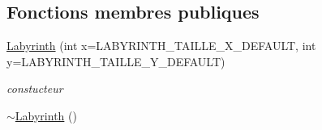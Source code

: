 \subsection*{Fonctions membres publiques}
\begin{DoxyCompactItemize}
\item 
\hyperlink{class_labyrinth_a13480c96c7e8d937adf6fd0b2dce8b6d}{Labyrinth} (int x=L\-A\-B\-Y\-R\-I\-N\-T\-H\-\_\-\-T\-A\-I\-L\-L\-E\-\_\-\-X\-\_\-\-D\-E\-F\-A\-U\-L\-T, int y=L\-A\-B\-Y\-R\-I\-N\-T\-H\-\_\-\-T\-A\-I\-L\-L\-E\-\_\-\-Y\-\_\-\-D\-E\-F\-A\-U\-L\-T)
\begin{DoxyCompactList}\small\item\em constucteur \end{DoxyCompactList}\item 
\hypertarget{class_labyrinth_a4c955f7eb91e1b1529899a157b410807}{\hyperlink{class_labyrinth_a4c955f7eb91e1b1529899a157b410807}{$\sim$\-Labyrinth} ()}\label{class_labyrinth_a4c955f7eb91e1b1529899a157b410807}


\end{DoxyCompactItemize}
